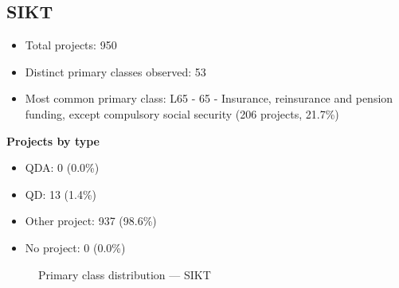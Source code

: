 \subsection{SIKT}

\begin{itemize}
    \item Total projects: 950
    \item Distinct primary classes observed: 53
    \item Most common primary class: L65 - 65 - Insurance, reinsurance and pension funding, except compulsory social security (206 projects, 21.7\%)
\end{itemize}
\textbf{Projects by type}
\begin{itemize}
    \item QDA: 0 (0.0\%)
    \item QD: 13 (1.4\%)
    \item Other project: 937 (98.6\%)
    \item No project: 0 (0.0\%)
\end{itemize}

\begin{figure}[H]
    \centering
    
    \caption{Primary class distribution --- SIKT}
\end{figure}

